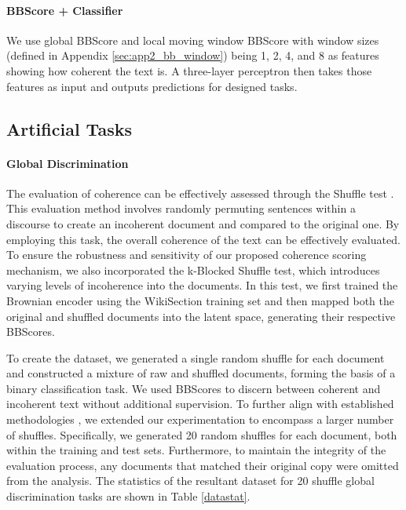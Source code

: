 \documentclass[letterpaper]{article} %
\begin{document}
\paragraph{BBScore + Classifier}\label{bbclf} We use global BBScore and local moving window BBScore with window sizes (defined in Appendix \ref{sec:app2_bb_window}) being 1, 2, 4, and 8 as features showing how coherent the text is. A three-layer perceptron then takes those features as input and outputs predictions for designed tasks.

\subsection{Artificial Tasks}\label{exp:art}

\paragraph{Global Discrimination} The evaluation of coherence can be effectively assessed through the Shuffle test \citep{barzilay-lapata-2008-modeling, moon-etal-2019-unified}. This evaluation method involves randomly permuting sentences within a discourse to create an incoherent document and compared to the original one. By employing this task, the overall coherence of the text can be effectively evaluated. To ensure the robustness and sensitivity of our proposed coherence scoring mechanism, we also incorporated the k-Blocked Shuffle test, which introduces varying levels of incoherence into the documents. In this test, we first trained the Brownian encoder using the WikiSection training set and then mapped both the original and shuffled documents into the latent space, generating their respective BBScores. 

To create the dataset, we generated a single random shuffle for each document and constructed a mixture of raw and shuffled documents, forming the basis of a binary classification task. We used BBScores to discern between coherent and incoherent text without additional supervision. To further align with established methodologies \citep{joty-etal-2018-coherence, moon-etal-2019-unified, jeon-strube-2022-entity}, we extended our experimentation to encompass a larger number of shuffles. Specifically, we generated 20 random shuffles for each document, both within the training and test sets. Furthermore, to maintain the integrity of the evaluation process, any documents that matched their original copy were omitted from the analysis. The statistics of the resultant dataset for 20 shuffle global discrimination tasks are shown in Table \ref{datastat}.
\end{document}
